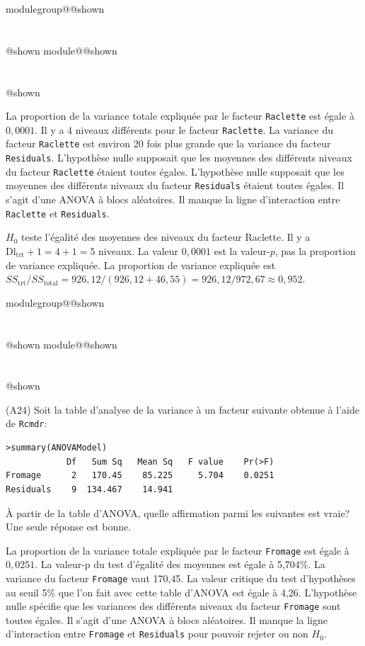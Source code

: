 \documentclass{Evaluation}
\makeatletter
\newcommand{\currentmodulekey}{}
\newcommand{\currentmoduletitle}{}
\newcommand{\currentgroupkey}{}
\newcommand{\currentgrouptitle}{}
\newcommand{\showmoduleifneeded}{%
  \ifx\currentgroupkey\empty\else
    \expandafter\ifx\csname modulegroup@\currentgroupkey @shown\endcsname\relax
      \section*{\currentgrouptitle}%
      \expandafter\gdef\csname modulegroup@\currentgroupkey @shown\endcsname{1}%
    \fi
  \fi
  \expandafter\ifx\csname module@\currentmodulekey @shown\endcsname\relax
    \section*{\currentmoduletitle}%
    \expandafter\gdef\csname module@\currentmodulekey @shown\endcsname{1}%
  \fi
}
\newenvironment{H24}{\showmoduleifneeded}{}
\newenvironment{A24}{\showmoduleifneeded}{}
\makeatother
\begin{document}
\begin{questions}
\begin{H24}
\begin{checkboxes}
\choice La proportion de la variance totale expliquée par le facteur \texttt{Raclette} est égale à $0,0001$. 
\choice Il y a 4 niveaux différents pour le facteur \texttt{Raclette}.
\choice La variance du facteur \texttt{Raclette} est environ 20 fois plus grande que la variance du facteur \texttt{Residuals}.
\correctchoice L'hypothèse nulle supposait que les moyennes des différents niveaux du facteur \texttt{Raclette} étaient toutes égales.
\choice L'hypothèse nulle supposait que les moyennes des différents niveaux du facteur \texttt{Residuals} étaient toutes égales.
\choice Il s'agit d'une ANOVA à blocs aléatoires.
\choice Il manque la ligne d'interaction entre \texttt{Raclette} et \texttt{Residuals}.
\end{checkboxes}

\begin{solution}
$H_0$ teste l'égalité des moyennes des niveaux du facteur Raclette. Il y a $\text{Dl}_{\text{trt}}+1 = 4+1 = 5$ niveaux. La valeur $0{,}0001$ est la valeur-$p$, pas la proportion de variance expliquée. La proportion de variance expliquée est $SS_{\text{trt}}/SS_{\text{total}} = 926{,}12/(926{,}12+46{,}55) = 926{,}12/972{,}67 \approx 0{,}952$.
\end{solution}
\end{H24}

\begin{A24}
\question (A24) Soit la table d'analyse de la variance à un facteur suivante obtenue à l'aide de \texttt{Rcmdr}:
\begin{verbatim}
>summary(ANOVAModel)
            Df   Sum Sq   Mean Sq   F value    Pr(>F)    
Fromage      2   170.45    85.225     5.704    0.0251
Residuals    9  134.467    14.941                      
\end{verbatim}

À partir de la table d'ANOVA, quelle affirmation parmi les suivantes est vraie? Une seule réponse est bonne.

\begin{checkboxes}
\choice La proportion de la variance totale expliquée par le facteur \texttt{Fromage} est égale à $0,0251$. 
\choice La valeur-p du test d'égalité des moyennes est égale à 5,704\%.
\choice La variance du facteur \texttt{Fromage} vaut 170,45.
\correctchoice La valeur critique du test d'hypothèses au seuil 5\% que l'on fait avec cette table d'ANOVA est égale à 4,26.
\choice L'hypothèse nulle spécifie que les variances des différents niveaux du facteur \texttt{Fromage} sont toutes égales.
\choice Il s'agit d'une ANOVA à blocs aléatoires.
\choice Il manque la ligne d'interaction entre \texttt{Fromage} et \texttt{Residuals} pour pouvoir rejeter ou non $H_0$. 
\end{checkboxes}


\end{A24}
\end{questions}
\end{document}
